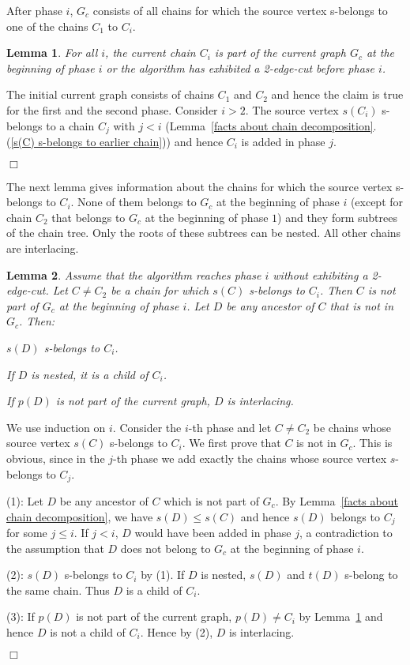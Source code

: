 \documentclass[paper=a4]{scrartcl}
\newtheorem{lemma}{Lemma}
\newcommand{\qed}{}
\newcommand{\mqed}{\hfill$\Box$}
\newlength{\proofpostskipamount}\newlength{\proofpreskipamount}
\newenvironment{proof}{\par\vspace{\proofpreskipamount}\noindent{\textbf{Proof:}}\hspace{0.5em}}{\nopagebreak \strut\nopagebreak \hspace{\fill}\mqed\par\vspace{\proofpostskipamount}\noindent}
\begin{document}
 After phase $i$, $G_c$ consists of all chains for which the source vertex s-belongs to one of the chains $C_1$ to $C_i$.

\begin{lemma}\label{prop:ci_already_added}
For all $i$, the current chain $C_i$ is part of the current graph $G_c$ at the beginning of phase $i$ or the algorithm has exhibited a 2-edge-cut before phase $i$.
\end{lemma}
\begin{proof}
The initial current graph consists of chains $C_1$ and $C_2$ and hence the claim is true for the first and the second phase. Consider $i > 2$. The source vertex $s(C_i)$ s-belongs to a chain $C_j$ with $j < i$ (Lemma~\ref{facts about chain decomposition}.(\ref{s(C) s-belongs to earlier chain})) and hence $C_i$ is added in phase $j$. \qed
\end{proof}

The next lemma gives information about the chains for which the source vertex s-belongs to $C_i$. None of them belongs to $G_c$ at the beginning of phase $i$ (except for chain $C_2$ that belongs to $G_c$ at the beginning of phase $1$) and they form subtrees of the chain tree. Only the roots of these subtrees can be nested. All other chains are interlacing.

\begin{lemma}\label{lem:no_type_one} Assume that the algorithm reaches phase $i$ without exhibiting a 2-edge-cut. Let $C \not= C_2$ be a chain for which $s(C)$ s-belongs to $C_i$. Then $C$ is not part of $G_c$ at the beginning of phase $i$. Let $D$ be any ancestor of $C$ that is not in $G_c$. Then:
\begin{compactenum}[(1)]
\item $s(D)$ s-belongs to $C_i$.
\item If $D$ is nested, it is a child of $C_i$.
\item If $p(D)$ is not part of the current graph, $D$ is interlacing.
\end{compactenum}
\end{lemma}
\begin{proof}
We use induction on $i$. Consider the $i$-th phase and let $C \not= C_2$ be chains whose source vertex $s(C)$ s-belongs to $C_i$. We first prove that $C$ is not in $G_c$. This is obvious, since in the $j$-th phase we add exactly the chains whose source vertex $s$-belongs to $C_j$.

(1): Let $D$ be any ancestor of $C$ which is not part of $G_c$. By Lemma~\ref{facts about chain decomposition}, we have $s(D) \le s(C)$ and hence $s(D)$ belongs to $C_j$ for some $j\le i$. If $j < i$, $D$ would have been added in phase $j$, a contradiction to the assumption that $D$ does not belong to $G_c$ at the beginning of phase $i$.

(2): $s(D)$ s-belongs to $C_i$ by (1). If $D$ is nested, $s(D)$ and $t(D)$ s-belong to the same chain. Thus $D$ is a child of $C_i$.

(3): If $p(D)$ is not part of the current graph, $p(D)\neq C_i$ by Lemma~\ref{prop:ci_already_added} and hence $D$ is not a child of $C_i$. Hence by (2), $D$ is interlacing.\qed
\end{proof}
\end{document}

